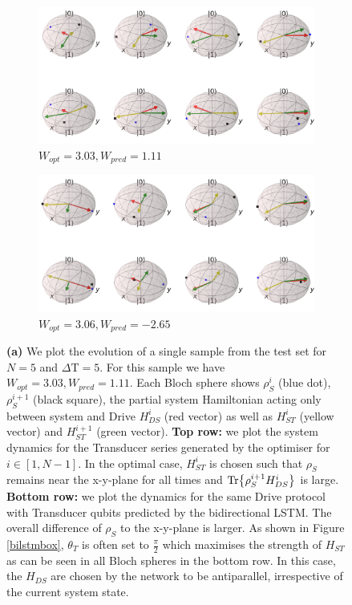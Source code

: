 \begin{figure}
	\centering
	\begin{subfigure}{0.85\textwidth}
		\centering
		\includegraphics[width=\textwidth]{img/bloch_10553_crop}
		\caption{$W_{opt} = 3.03, W_{pred} = 1.11$}
		\label{bloch_10553}
	\end{subfigure}
	\begin{subfigure}{0.85\textwidth}
		\centering
		\includegraphics[width=\textwidth]{img/bloch_worst_crop}
		\caption{$W_{opt} = 3.06, W_{pred} = -2.65$}
		\label{bloch_worst}
	\end{subfigure}
	\caption{\textbf{(a)} We plot the evolution of a single sample from the test set for $N=5$ and $\Delta \mathrm{T} = 5$. For this sample we have $W_{opt} = 3.03, W_{pred} = 1.11$. Each Bloch sphere shows $\rho_S^i$ (blue dot), $\rho_S^{i+1}$ (black square), the partial system Hamiltonian acting only between system and Drive $H_{DS}^i$ (red vector) as well as $H_{ST}^i$ (yellow vector) and $H_{ST}^{i+1}$ (green vector). \textbf{Top row:} we plot the system dynamics for the Transducer series generated by the optimiser for $i \in [1, N - 1]$. In the optimal case, $H_{ST}^i$ is chosen such that $\rho_S$ remains near the x-y-plane for all times and $\Tr{\rho_S^{i+1} H_{DS}^i}$ is large. \textbf{Bottom row:} we plot the dynamics for the same Drive protocol with Transducer qubits predicted by the bidirectional LSTM. The overall difference of $\rho_S$ to the x-y-plane is larger. As shown in Figure \ref{bilstmbox}, $\theta_T$ is often set to $\frac{\pi}{2}$ which maximises the strength of $H_{ST}$ as can be seen in all Bloch spheres in the bottom row. In this case, the $H_{DS}$ are chosen by the network to be antiparallel, irrespective of the current system state.
}
\end{figure}
